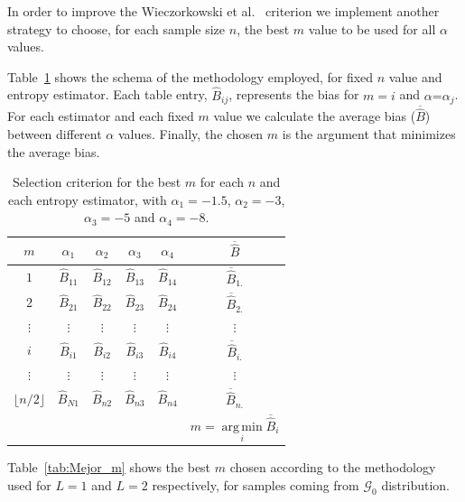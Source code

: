 \documentclass[journal]{IEEEtran}
\DeclareMathOperator*{\argmin}{arg\,min}
\begin{document}
In order to improve the Wieczorkowski et al.~\cite{Wieczorkowski1999} criterion we implement another strategy to choose, for each sample size $n$, the best $m$ value to be used for all $\alpha$ values.

Table~\ref{tab:eleccion_mejor_m} shows the schema of the methodology employed, for fixed $n$ value and entropy estimator. 
Each table entry, $\widehat{B}_{ij}$, represents the bias for $m=i$ and $\alpha \text{=} \alpha_j$. 
For each estimator and each fixed $m$ value we calculate the average bias ($\overline{\widehat{B}}$) between different $\alpha$ values. Finally, the chosen $m$ is the argument that minimizes the average bias.

\begin{table}[hbt]
	\caption{Selection criterion for the best $m$ for each $n$ and each entropy estimator, with $\alpha_1= -1.5$, $\alpha_2=-3$, $\alpha_3=-5$ and $\alpha_4=-8$.}
	\label{tab:eleccion_mejor_m}
	\centering
	\begin{tabular}{c c c c c c}
		\toprule
		$m$	& $\alpha_{1}$ & $\alpha_{2}$
		& $\alpha_{3}$
		& $\alpha_{4}$ & $\overline{\widehat{B}}$ \\
		
		\midrule
		$1$	& $\widehat{B}_{11}$ & $\widehat{B}_{12}$ & $\widehat{B}_{13}$ & $\widehat{B}_{14}$ & $\overline{\widehat{B}}_{1.}$\\
		
		$2$	& $\widehat{B}_{21}$ & $\widehat{B}_{22}$ & $\widehat{B}_{23}$ & $\widehat{B}_{24}$ & $\overline{\widehat{B}}_{2.}$\\
		$\vdots$ & $\vdots$ & $\vdots$ & $\vdots$ & $\vdots$ & $\vdots$ \\
		
		$i$ & $\widehat{B}_{i1}$ & $\widehat{B}_{i2}$ & $\widehat{B}_{i3}$ & $\widehat{B}_{i4}$ & $\overline{\widehat{B}}_{i.}$\\
		$\vdots$ & $\vdots$ & $\vdots$ & $\vdots$ & $\vdots$ & $\vdots$\\
		
		$\lfloor n/2 \rfloor$ & $\widehat{B}_{N1}$ & $\widehat{B}_{n2}$ & $\widehat{B}_{n3}$ & $\widehat{B}_{n4}$ & $\overline{\widehat{B}}_{n.}$\\
		\bottomrule
		& & & & & $m=\argmin\limits_{i} \overline{\widehat{B}}_{i}$\\
		
		\bottomrule
	\end{tabular}
\end{table}	

Table~\ref{tab:Mejor_m} shows the best $m$ chosen according to the methodology used for $L=1$ and $L=2$ respectively, for samples coming from $\mathcal{G}_0$ distribution. 
\end{document}
